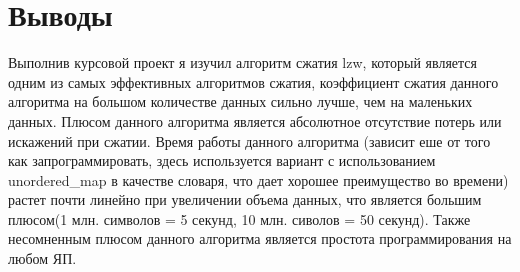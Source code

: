 \section{Выводы}
Выполнив курсовой проект я изучил алгоритм сжатия lzw, который является одним из самых эффективных алгоритмов сжатия, коэффициент сжатия данного алгоритма на большом количестве данных сильно лучше, чем на маленьких данных. Плюсом данного алгоритма является абсолютное отсутствие потерь или искажений при сжатии. Время работы данного алгоритма (зависит еше от того как запрограммировать, здесь используется вариант с использованием unordered\_map в качестве словаря, что дает хорошее преимущество во времени) растет почти линейно при увеличении объема данных, что является большим плюсом(1 млн. символов = 5 секунд, 10 млн. сиволов =  50 секунд). Также несомненным плюсом данного алгоритма является простота программирования на любом ЯП.
\pagebreak